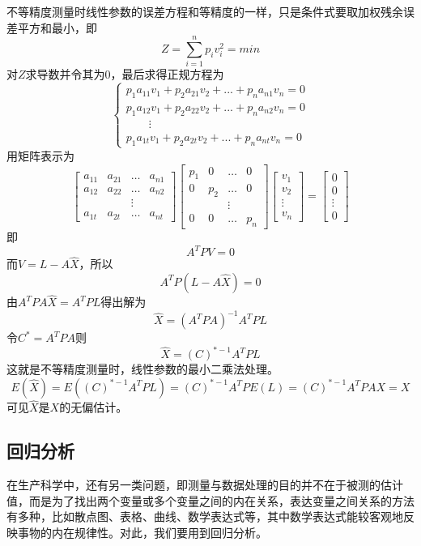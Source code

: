 \begin{enumerate}
	\qquad 不等精度测量时线性参数的误差方程和等精度的一样，只是条件式要取加权残余误差平方和最小，即\[ Z=\sum_{i=1}^{n}p_iv_i^2=min \]
	对$ Z $求导数并令其为0，最后求得正规方程为\[ \begin{cases}
		p_1a_{11}v_1+p_2a_{21}v_2+...+p_na_{n1}v_n=0\\
		p_1a_{12}v_1+p_2a_{22}v_2+...+p_na_{n2}v_n=0\\
		\qquad \vdots\\
		p_1a_{1t}v_1+p_2a_{2t}v_2+...+p_na_{nt}v_n=0
	\end{cases} \]
	用矩阵表示为\[ \begin{bmatrix}
		a_{11}&a_{21}&\dots&a_{n1}\\
		a_{12}&a_{22}&\dots&a_{n2}\\
		& 	 &\vdots\\
		a_{1t}&a_{2t}&\dots&a_{nt}
	\end{bmatrix}\begin{bmatrix}
		p_1	&	0	&	\dots&	0\\
		0	&	p_2	&	\dots&	0\\
		& 	 &\vdots\\
		0	&	0	&	\dots&	p_n
	\end{bmatrix}\begin{bmatrix}
		v_1\\v_2\\\vdots\\v_n
	\end{bmatrix}=\begin{bmatrix}
		0\\0\\\vdots\\0
	\end{bmatrix} \]
	即\[ A^TPV=0 \]
	而$ V=L-A\hat{X} $，所以\[ A^TP(L-A\hat{X})=0 \]
	由$ A^TPA\hat{X}=A^TPL $得出解为\[ \hat{X}=(A^TPA)^{-1}A^TPL \]
	令$ C^*=A^TPA $则\[ \hat{X}=(C)^{*-1}A^TPL \]
	这就是不等精度测量时，线性参数的最小二乘法处理。
	\[ E(\hat{X})=E((C)^{*-1}A^TPL)=(C)^{*-1}A^TPE(L)=(C)^{*-1}A^TPAX=X \]
	可见$ \hat{X} $是$ X $的无偏估计。
\end{enumerate}
\subsection{回归分析}
在生产科学中，还有另一类问题，即测量与数据处理的目的并不在于被测的估计值，而是为了找出两个变量或多个变量之间的内在关系，表达变量之间关系的方法有多种，比如散点图、表格、曲线、数学表达式等，其中数学表达式能较客观地反映事物的内在规律性。对此，我们要用到回归分析。

